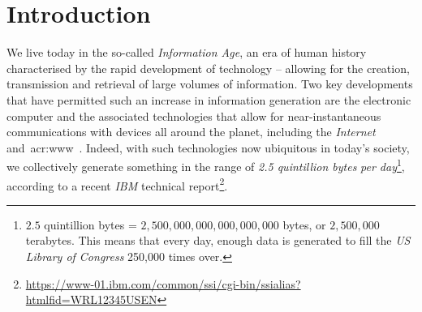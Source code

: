 
\chapter{Introduction}\label{chap:intro}
We live today in the so-called \emph{Information Age}, an era of human history characterised by the rapid development of technology -- allowing for the creation, transmission and retrieval of large volumes of information. Two key developments that have permitted such an increase in information generation are the electronic computer and the associated technologies that allow for near-instantaneous communications with devices all around the planet, including the \emph{Internet} and~\gls{acr:www}~\citep{berners1994www}. Indeed, with such technologies now ubiquitous in today's society, we collectively generate something in the range of \emph{2.5 quintillion bytes} \emph{per day}\footnote{$2.5$ quintillion bytes = $2,500,000,000,000,000,000$ bytes, or $2,500,000$ terabytes. This means that every day, enough data is generated to fill the \emph{US Library of Congress} 250,000 times over.}, according to a recent \emph{IBM} technical report\footnote{\url{https://www-01.ibm.com/common/ssi/cgi-bin/ssialias?htmlfid=WRL12345USEN}}.


\begin{figure}[h]
    \centering
    \vspace{5mm}
    \label{fig:stopsign}
    \vspace{-4mm}
\end{figure}

